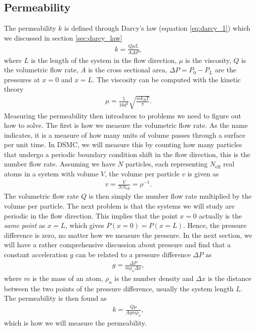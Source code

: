\subsection{Permeability}
\label{sec:permeability_dsmc}
The permeability $k$ is defined through Darcy's law (equation \eqref{eq:darcy_1}) which we discussed in section \ref{sec:darcy_law}
\begin{align}
	\label{eq:permeability_gas}
	k = \frac{Q \mu L}{A\Delta P},
\end{align}
where $L$ is the length of the system in the flow direction, $\mu$ is the viscosity, $Q$ is the volumetric flow rate, $A$ is the cross sectional area, $\Delta P = P_0 - P_L$ are the pressures at $x=0$ and $x=L$. The viscosity can be computed with the kinetic theory \cite{alexander1998cell}
\begin{align}
	\mu = \frac{5}{16d^2}\sqrt{\frac{mk_B T}{\pi}}.
\end{align}
Measuring the permeability then introduces to problems we need to figure out how to solve. The first is how we measure the volumetric flow rate. As the name indicates, it is a measure of how many units of volume passes through a surface per unit time. In DSMC, we will measure this by counting how many particles that undergo a periodic boundary condition shift in the flow direction, this is the number flow rate. Assuming we have $N$ particles, each representing $N_\text{eff}$ real atoms in a system with volume $V$, the volume per particle $v$ is given as
\begin{align}
 	v = \frac{V}{NN_\text{eff}} = \rho^{-1}.
\end{align} 
The volumetric flow rate $Q$ is then simply the number flow rate multiplied by the volume per particle. The next problem is that the systems we will study are periodic in the flow direction. This implies that the point $x=0$ actually is the \textit{same point} as $x=L$, which gives $P(x=0) = P(x=L)$. Hence, the pressure difference is zero, no matter how we measure the pressure. In the next section, we will have a rather comprehensive discussion about pressure and find that a constant acceleration $g$ can be related to a pressure difference $\Delta P$ as
\begin{align}
	g = \frac{\Delta P}{m\rho_n\Delta x},
\end{align}
where $m$ is the mass of an atom, $\rho_n$ is the number density and $\Delta x$ is the distance between the two points of the pressure difference, usually the system length $L$. The permeability is then found as
\begin{align}
	k = \frac{Q \mu}{Agm\rho_n},
\end{align}
which is how we will measure the permeability.